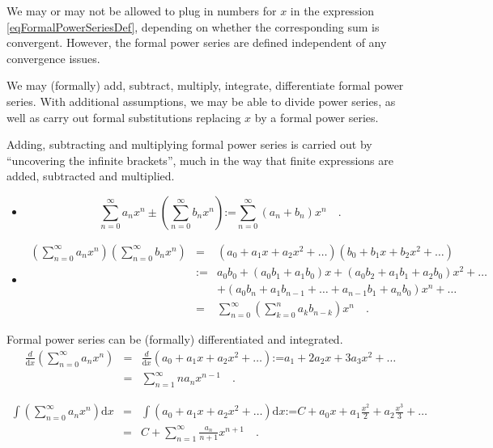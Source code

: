 \documentclass[12pt]{book}
\newcommand{\diff}{\text{d}}
\newcommand{\eqdef}{\textbf{:=}}
\begin{document}
We may or may not be allowed to plug in numbers for $x$ in the expression \eqref{eqFormalPowerSeriesDef}, depending on whether the corresponding sum is convergent. However, the formal power series are defined independent of any convergence issues.

We may (formally) add, subtract, multiply, integrate, differentiate formal power series. With additional assumptions, we may be able to divide power series, as well as carry out formal substitutions replacing $x$ by a formal power series. 

Adding, subtracting and multiplying formal power series is carried out by ``uncovering the infinite brackets'', much in the way that finite expressions are added, subtracted and multiplied.
\begin{itemize}
\item 
\[
\sum_{n=0}^\infty a_n x^n\pm \left(\sum_{n=0}^\infty b_n x^n\right)\eqdef \sum_{n=0}^\infty (a_n+b_n)x^n\quad .
\]
\item
\[
\begin{array}{rcl}
\displaystyle\left(\sum_{n=0}^\infty a_n x^n\right) \left(\sum_{n=0}^\infty b_n x^n\right) &=& 
(a_0 + a_1x+a_2x^2+\dots )(b_0 + b_1x+b_2x^2+\dots )\\&\eqdef& 
a_0b_0 + (a_0b_1+a_1b_0)x + (a_0b_2+a_1b_1+a_2b_0)x^2+\dots \\
&&+(a_0 b_n +a_1b_{n-1}+\dots + a_{n-1}b_1 +a_nb_0 )x^n+\dots \\
&=&\displaystyle \sum_{n=0}^{\infty} \left(\sum_{k=0}^n a_k b_{n-k}  \right)x^n\quad .
\end{array}
\] 
\end{itemize}

Formal power series can be (formally) differentiated and integrated. 
\[
\begin{array}{rcl}
\displaystyle
\frac{d}{\diff x}\left(\sum_{n=0}^{\infty} a_n x^n\right) &=& \displaystyle \frac{d}{\diff x} \left(a_0 +a_1x+a_2x^2+\dots \right)\eqdef a_1+2 a_2 x+ 3a_3x^2 +\dots\\
&=&\displaystyle \sum_{n=1}^{\infty} na_nx^{n-1}\quad .
\end{array}
\]

\[
\begin{array}{rcl}
\displaystyle \int \left(\sum_{n=0}^{\infty} a_n x^n\right)\diff x &=&\displaystyle \int (a_0 +a_1x+a_2x^2+\dots )\diff x\eqdef C+ a_0x +a_1\frac{x^2}{2}+a_2\frac{x^3}3+\dots 
\\
&=&\displaystyle C+\sum_{n=1}^{\infty} \frac{a_n}{n+1}x^{n+1}\quad . 
\end{array}
\]
\end{document}
